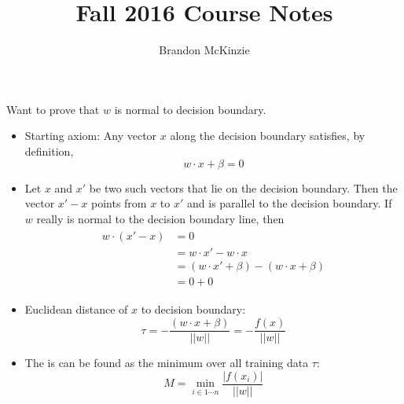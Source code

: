 \documentclass[12pt]{article}
\title{\vspace{-10mm}\fontsize{24pt}{8pt}\selectfont\textbf{Fall 2016 Course Notes}\vspace*{-4mm}}
\author{Brandon McKinzie}
\date{}
\newcommand\p{\Needspace{10\baselineskip} \noindent}
\begin{document}
\dosecttoc
\tableofcontents


\label{Machine Learning}

\p {} Want to prove that $w$ is normal to decision boundary.
\begin{itemize}
	\item Starting axiom: Any vector $x$ along the decision boundary satisfies, by definition,
	\begin{equation}
		w \cdot x + \beta = 0
	\end{equation}
	\item Let $x$ and $x'$ be two such vectors that lie on the decision boundary. Then the vector $x' - x$ points from $x$ to $x'$ and is parallel to the decision boundary. If $w$ really is normal to the decision boundary line, then
	\begin{align}
	\begin{split}
	w \cdot (x' - x) &= 0 \\
	&= w \cdot x' - w \cdot x \\
	&= (w \cdot x' + \beta) - (w \cdot x + \beta) \\
	&= 0 + 0
	\end{split}
	\end{align}
\item Euclidean distance of $x$ to decision boundary:
\begin{equation}
\tau = - \frac{(w \cdot x + \beta)}{||w||} = - \frac{f(x)}{||w||}
\end{equation}
\item The  is can be found as the minimum over all training data $\tau$:
\begin{equation}
M = \min_{i \in 1 \cdots n} \frac{|f(x_i)|}{||w||}
\end{equation}
\end{itemize}

\end{document}
